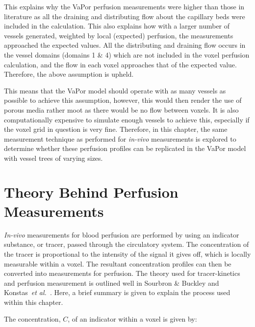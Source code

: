 \documentclass[11pt,english,a4paper,twoside,openright]{report}
\begin{document}
{{{{{{{{This explains why the VaPor perfusion measurements were higher than those in literature as all the draining and distributing flow about the capillary beds were included in the calculation. This also explains how with a larger number of vessels generated, weighted by local (expected) perfusion, the measurements approached the expected values. All the distributing and draining flow occurs in the vessel domains (domains 1 \& 4) which are not included in the voxel perfusion calculation, and the flow in each voxel approaches that of the expected value. Therefore, the above assumption is upheld.

This means that the VaPor model should operate with as many vessels as possible to achieve this assumption, however, this would then render the use of porous media rather moot as there would be no flow between voxels. It is also computationally expensive to simulate enough vessels to achieve this, especially if the voxel grid in question is very fine. Therefore, in this chapter, the same measurement technique as performed for \textit{in-vivo} measurements is explored to determine whether these perfusion profiles can be replicated in the VaPor model with vessel trees of varying sizes.

\section[Theory Behind Perfusion Measurements]{{\Large T}heory {\Large B}ehind {\Large P}erfusion {\Large M}easurements}

\textit{In-vivo} measurements for blood perfusion are performed by using an indicator substance, or tracer, passed through the circulatory system. The concentration of the tracer is proportional to the intensity of the signal it gives off, which is locally measurable within a voxel. The resultant concentration profiles can then be converted into measurements for perfusion. The theory used for tracer-kinetics and perfusion measurement is outlined well in Sourbron \& Buckley \cite{sourbron2013classic} and Konstas~\textit{et al.\ }\cite{konstas2009theoretic}. Here, a brief summary is given to explain the process used within this chapter.

The concentration, $C$, of an indicator within a voxel is given by:

}}}}}}}}
\end{document}
